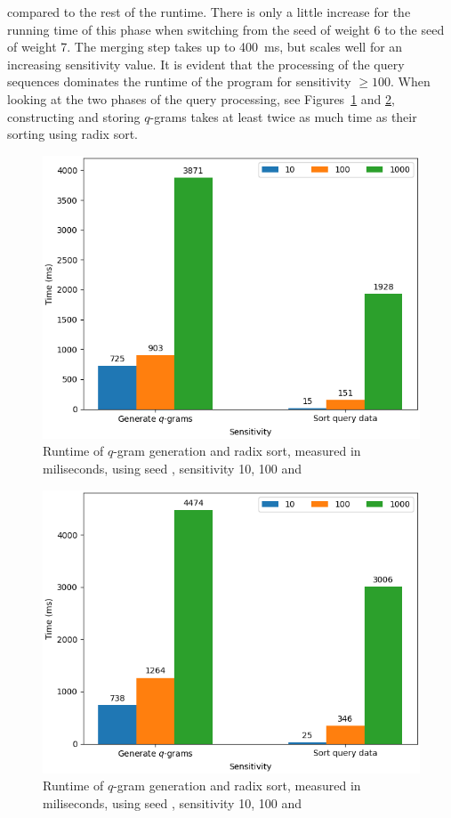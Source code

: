 \documentclass[twoside,a4paper,bsc]{master}
\newcommand{\Qgram}[1]{\(#1\)-gram}
\begin{document}
compared to the rest of the runtime. There is only a little increase for the
running time of this phase when switching from the seed 
of weight 6 to the seed  of weight 7.
The merging step takes up to 400~ms, but scales well for an increasing
sensitivity value. It is evident that the processing of the query sequences
dominates the runtime of the program for sensitivity \(\geq 100\).
When looking at the two phases of the query processing,
see Figures~\ref{fig:hotspot_w6} and \ref{fig:hotspot_w7}, constructing and
storing \(q\)-grams takes at least twice as much time
as their sorting using radix sort.
\begin{figure}
\centering
\includegraphics[scale=0.6]{graphics/hotspot_w6.png}
\caption{Runtime of \Qgram{q} generation and radix sort, measured in
miliseconds,
using seed , sensitivity 10, 100 and }
\label{fig:hotspot_w6}
\end{figure}
\begin{figure}
\centering
\includegraphics[scale=0.6]{graphics/hotspot_w7.png}
\caption{Runtime of \Qgram{q} generation and radix sort, measured in
miliseconds,
using seed , sensitivity 10, 100 and }
\label{fig:hotspot_w7}
\end{figure}
\end{document}

